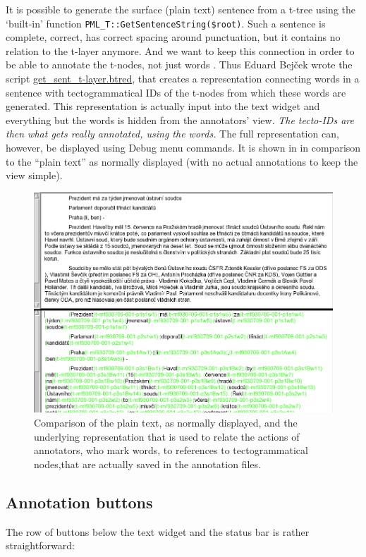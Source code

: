 It is possible to generate the surface (plain text) sentence from a t-tree using the `built-in' function \verb=PML_T::GetSentenceString($root)=. Such a sentence is complete, correct, has correct spacing around punctuation, but it contains no relation to the t-layer anymore. And we want to keep this connection in order to be able to annotate the t-nodes, not just words . Thus Eduard Bejček wrote the script \url{get_sent_t-layer.btred}, that creates a representation connecting words in a sentence with tectogrammatical IDs of the t-nodes from which these words are generated. This representation is actually input into the text widget and everything but the words is hidden from the annotators' view. \emph{The tecto-IDs are then what gets really annotated, \emph{using} the words.} The full representation can, however, be displayed using Debug menu commands. It is shown in  in comparison to the ``plain text'' as normally displayed (with no actual annotations to keep the view simple).

\begin{figure}[htbp]
   \centering
   \includegraphics[width=.95\textwidth]{images/hidden-text}
   \caption{Comparison of the plain text, as normally displayed, and the underlying representation that is used to relate the actions of annotators, who mark words, to references to tectogrammatical nodes,that are actually saved in the annotation files.}
   \label{fig:seman:hidden}
\end{figure}



\subsection{Annotation buttons}
The row of buttons below the text widget and the status bar is rather straightforward: 

